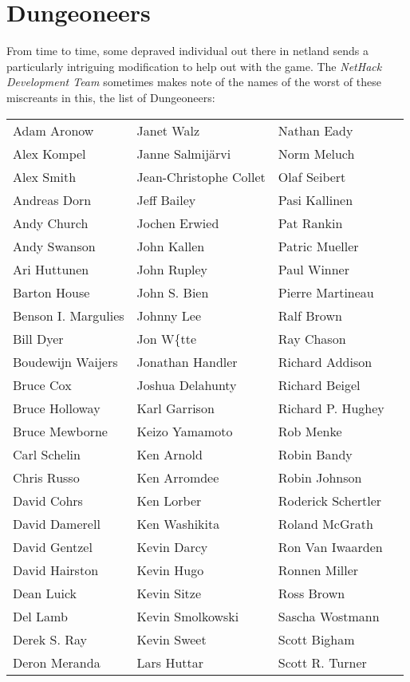 \section*{Dungeoneers}
\nd From time to time, some depraved individual out there in netland sends a
particularly intriguing modification to help out with the game.  The 
{\it NetHack Development Team} sometimes makes note of the names of the worst
of these miscreants in this, the list of Dungeoneers:
\begin{center}
\begin{tabular}{llll}
Adam Aronow & Janet Walz & Nathan Eady\\
Alex Kompel & Janne Salmij\"{a}rvi & Norm Meluch\\
Alex Smith & Jean-Christophe Collet & Olaf Seibert\\
Andreas Dorn & Jeff Bailey & Pasi Kallinen\\
Andy Church & Jochen Erwied & Pat Rankin\\
Andy Swanson & John Kallen & Patric Mueller\\
Ari Huttunen & John Rupley & Paul Winner\\
Barton House & John S. Bien & Pierre Martineau\\
Benson I. Margulies & Johnny Lee & Ralf Brown\\
Bill Dyer & Jon W\{tte & Ray Chason\\
Boudewijn Waijers & Jonathan Handler & Richard Addison\\
Bruce Cox & Joshua Delahunty & Richard Beigel\\
Bruce Holloway & Karl Garrison & Richard P. Hughey\\
Bruce Mewborne & Keizo Yamamoto & Rob Menke\\
Carl Schelin & Ken Arnold & Robin Bandy\\
Chris Russo & Ken Arromdee & Robin Johnson\\
David Cohrs & Ken Lorber & Roderick Schertler\\
David Damerell & Ken Washikita & Roland McGrath\\
David Gentzel & Kevin Darcy & Ron Van Iwaarden\\
David Hairston & Kevin Hugo & Ronnen Miller\\
Dean Luick & Kevin Sitze & Ross Brown\\
Del Lamb & Kevin Smolkowski & Sascha Wostmann\\
Derek S. Ray & Kevin Sweet & Scott Bigham\\
Deron Meranda & Lars Huttar & Scott R. Turner\\

\end{tabular}
\end{center}
